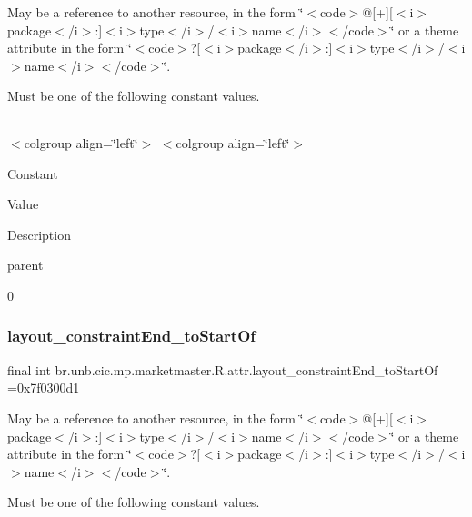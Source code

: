 May be a reference to another resource, in the form \char`\"{}$<$code$>$@\mbox{[}+\mbox{]}\mbox{[}$<$i$>$package$<$/i$>$\+:\mbox{]}$<$i$>$type$<$/i$>$/$<$i$>$name$<$/i$>$$<$/code$>$\char`\"{} or a theme attribute in the form \char`\"{}$<$code$>$?\mbox{[}$<$i$>$package$<$/i$>$\+:\mbox{]}$<$i$>$type$<$/i$>$/$<$i$>$name$<$/i$>$$<$/code$>$\char`\"{}. 

Must be one of the following constant values.

\tabulinesep=1mm
\begin{longtabu} spread 0pt [c]{*{0}{|X[-1]}|}
\hline
\end{longtabu}
$<$colgroup align=\char`\"{}left\char`\"{}$>$ $<$colgroup align=\char`\"{}left\char`\"{}$>$ 

Constant

Value

Description 

parent

0\mbox{\label{classbr_1_1unb_1_1cic_1_1mp_1_1marketmaster_1_1R_1_1attr_aa37eb621b318f9df729fc7498b7e5320}} 
\subsubsection{\texorpdfstring{layout\+\_\+constraint\+End\+\_\+to\+Start\+Of}{layout\_constraintEnd\_toStartOf}}
{\footnotesize\ttfamily final int br.\+unb.\+cic.\+mp.\+marketmaster.\+R.\+attr.\+layout\+\_\+constraint\+End\+\_\+to\+Start\+Of =0x7f0300d1\hspace{0.3cm}{\ttfamily [static]}}

May be a reference to another resource, in the form \char`\"{}$<$code$>$@\mbox{[}+\mbox{]}\mbox{[}$<$i$>$package$<$/i$>$\+:\mbox{]}$<$i$>$type$<$/i$>$/$<$i$>$name$<$/i$>$$<$/code$>$\char`\"{} or a theme attribute in the form \char`\"{}$<$code$>$?\mbox{[}$<$i$>$package$<$/i$>$\+:\mbox{]}$<$i$>$type$<$/i$>$/$<$i$>$name$<$/i$>$$<$/code$>$\char`\"{}. 

Must be one of the following constant values.

